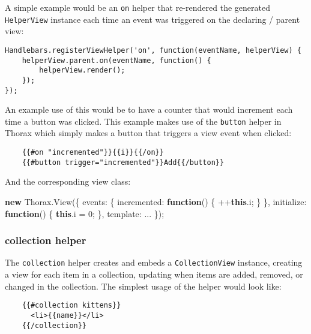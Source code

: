 \documentclass[9pt]{book}
\newenvironment{Shaded}{}{}
\newcommand{\KeywordTok}[1]{\textcolor[rgb]{0.00,0.44,0.13}{\textbf{{#1}}}}
\newcommand{\DataTypeTok}[1]{\textcolor[rgb]{0.56,0.13,0.00}{{#1}}}
\newcommand{\DecValTok}[1]{\textcolor[rgb]{0.25,0.63,0.44}{{#1}}}
\newcommand{\OtherTok}[1]{\textcolor[rgb]{0.00,0.44,0.13}{{#1}}}
\newcommand{\FunctionTok}[1]{\textcolor[rgb]{0.02,0.16,0.49}{{#1}}}
\newcommand{\NormalTok}[1]{{#1}}
\begin{document}
A simple example would be an \texttt{on} helper that re-rendered the
generated \texttt{HelperView} instance each time an event was triggered
on the declaring / parent view:

\begin{verbatim}
Handlebars.registerViewHelper('on', function(eventName, helperView) {
    helperView.parent.on(eventName, function() {
        helperView.render();
    });
});
\end{verbatim}

An example use of this would be to have a counter that would increment
each time a button was clicked. This example makes use of the
\texttt{button} helper in Thorax which simply makes a button that
triggers a view event when clicked:

\begin{verbatim}
    {{#on "incremented"}}{{i}}{{/on}}
    {{#button trigger="incremented"}}Add{{/button}}
\end{verbatim}

And the corresponding view class:

\begin{Shaded}
\begin{Highlighting}[]
    \KeywordTok{new} \OtherTok{Thorax}\NormalTok{.}\FunctionTok{View}\NormalTok{(\{}
        \DataTypeTok{events}\NormalTok{: \{}
            \DataTypeTok{incremented}\NormalTok{: }\KeywordTok{function}\NormalTok{() \{}
                \NormalTok{++}\KeywordTok{this}\NormalTok{.}\FunctionTok{i}\NormalTok{;}
            \NormalTok{\}}
        \NormalTok{\},}
        \DataTypeTok{initialize}\NormalTok{: }\KeywordTok{function}\NormalTok{() \{}
            \KeywordTok{this}\NormalTok{.}\FunctionTok{i} \NormalTok{= }\DecValTok{0}\NormalTok{;}
        \NormalTok{\},}
        \DataTypeTok{template}\NormalTok{: ...}
    \NormalTok{\});}
\end{Highlighting}
\end{Shaded}

\subsubsection{collection helper}\label{collection-helper}

The \texttt{collection} helper creates and embeds a
\texttt{CollectionView} instance, creating a view for each item in a
collection, updating when items are added, removed, or changed in the
collection. The simplest usage of the helper would look like:

\begin{verbatim}
    {{#collection kittens}}
      <li>{{name}}</li>
    {{/collection}}
\end{verbatim}
\end{document}
